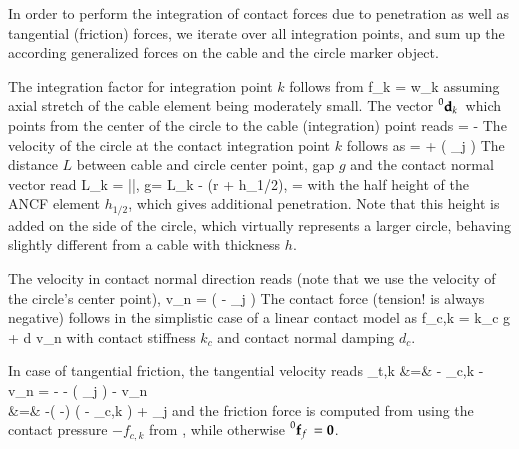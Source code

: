 In order to perform the integration of contact forces due to penetration as well as tangential (friction) forces, we iterate over all integration points, and sum up the according generalized forces on the cable and the circle marker object.

\noindent The integration factor for integration point $k$ follows from
\be
  f_k =  w_k \eqComma
\ee
assuming axial stretch of the cable element being moderately small.
The vector $\prescript{0}{}{\mathbf{d}_k}\,$ which points from the center of the circle to the cable (integration) point reads
\be
  \ANCFdk =  -  
\ee
The velocity of the circle at the contact integration point $k$ follows as
\be
   =  + \left(  _{j} \right) \times \ANCFdk
\ee
The distance $L$ between cable and circle center point, gap $g$ and the contact normal vector read
\be
  L_k = |\ANCFdk|, \quad g= L_k - (r + h_{1/2}), \quad {} =  \ANCFdk
\ee
with the half height of the ANCF element $h_{1/2}$, which gives additional penetration. Note that this height is added on the side of the circle, which virtually represents a larger circle, behaving slightly different from a cable with thickness $h$.

\noindent The velocity in contact normal direction reads (note that we use the velocity of the circle's center point),
\be
  v_n =  \left(  - _j \right)
\ee
The contact force (tension! is always negative) follows in the simplistic case of a linear contact model as
\be \label{eq_GeneralContactASfc}
  f_{c,k} = k_c \cdot g  + d \cdot v_n
\ee
with contact stiffness $k_c$ and contact normal damping $d_c$.

\noindent In case of tangential friction, the tangential velocity reads
\bea
  \vv_{t,k} &=&  - _{c,k} - v_n \cdot {}
  =  -  - \left(  _{j} \right) \times \ANCFdk - v_n \cdot {} \nonumber \\
  &=& -\left( \otimes {} -\Im \right) \left(  - _{c,k} \right) 
      +  _{j} 
\eea
and the friction force is computed from  using the contact pressure $-f_{c,k}$ from , while otherwise $\prescript{0}{}{\mathbf{f}_f}\, = \mathbf{0}$.

